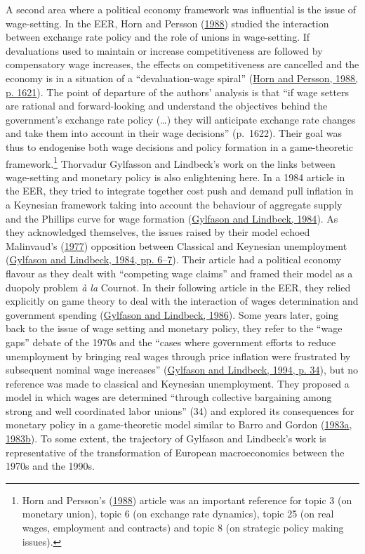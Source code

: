 \documentclass[
  12pt,
  onecolumn]{article}
\begin{document}
A second area where a political economy framework was influential is the
issue of wage-setting. In the EER, Horn and Persson
(\protect\hyperlink{ref-horn1988}{1988}) studied the interaction between
exchange rate policy and the role of unions in wage-setting. If
devaluations used to maintain or increase competitiveness are followed
by compensatory wage increases, the effects on competitiveness are
cancelled and the economy is in a situation of a ``devaluation-wage
spiral'' (\protect\hyperlink{ref-horn1988}{Horn and Persson, 1988, p.
1621}). The point of departure of the authors' analysis is that ``if
wage setters are rational and forward-looking and understand the
objectives behind the government's exchange rate policy (\ldots) they
will anticipate exchange rate changes and take them into account in
their wage decisions'' (p.~1622). Their goal was thus to endogenise both
wage decisions and policy formation in a game-theoretic
framework.\footnote{Horn and Persson's
  (\protect\hyperlink{ref-horn1988}{1988}) article was an important
  reference for topic 3 (on monetary union), topic 6 (on exchange rate
  dynamics), topic 25 (on real wages, employment and contracts) and
  topic 8 (on strategic policy making issues).} Thorvadur Gylfasson and
Lindbeck's work on the links between wage-setting and monetary policy is
also enlightening here. In a 1984 article in the EER, they tried to
integrate together cost push and demand pull inflation in a Keynesian
framework taking into account the behaviour of aggregate supply and the
Phillips curve for wage formation
(\protect\hyperlink{ref-gylfason1984}{Gylfason and Lindbeck, 1984}). As
they acknowledged themselves, the issues raised by their model echoed
Malinvaud's (\protect\hyperlink{ref-malinvaud1977}{1977}) opposition
between Classical and Keynesian unemployment
(\protect\hyperlink{ref-gylfason1984}{Gylfason and Lindbeck, 1984, pp.
6--7}). Their article had a political economy flavour as they dealt with
``competing wage claims'' and framed their model as a duopoly problem
\emph{à la} Cournot. In their following article in the EER, they relied
explicitly on game theory to deal with the interaction of wages
determination and government spending
(\protect\hyperlink{ref-gylfason1986}{Gylfason and Lindbeck, 1986}).
Some years later, going back to the issue of wage setting and monetary
policy, they refer to the ``wage gaps'' debate of the 1970s and the
``cases where government efforts to reduce unemployment by bringing real
wages through price inflation were frustrated by subsequent nominal wage
increases'' (\protect\hyperlink{ref-gylfason1994}{Gylfason and Lindbeck,
1994, p. 34}), but no reference was made to classical and Keynesian
unemployment. They proposed a model in which wages are determined
``through collective bargaining among strong and well coordinated labor
unions'' (34) and explored its consequences for monetary policy in a
game-theoretic model similar to Barro and Gordon
(\protect\hyperlink{ref-barro1983}{1983a},
\protect\hyperlink{ref-barro1983c}{1983b}). To some extent, the
trajectory of Gylfason and Lindbeck's work is representative of the
transformation of European macroeconomics between the 1970s and the
1990s.
\end{document}
